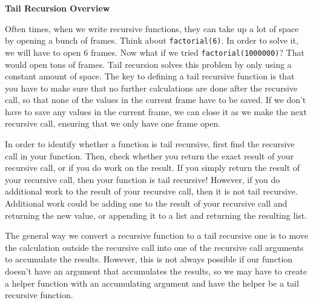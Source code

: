 \textbf{Tail Recursion Overview }


Often times, when we write recursive functions, they can take up a lot of space by opening a bunch of frames.  Think about \texttt{factorial(6)}.  In order to solve it, we will have to open 6 frames.  Now what if we tried \texttt{factorial(1000000)}?  That would open tons of frames.  Tail recursion solves this problem by only using a constant amount of space.  The key to defining a tail recursive function is that you have to make sure that no further calculations are done after the recursive call, so that none of the values in the current frame have to be saved.  If we don’t have to save any values in the current frame, we can close it as we make the next recursive call, ensuring that we only have one frame open.

In order to identify whether a function is tail recursive, first find the recursive call in your function. Then, check whether you return the exact result of your recursive call, or if you do work on the result. If you simply return the result of your recursive call, then your function is tail recursive! However, if you do additional work to the result of your recursive call, then it is not tail recursive. Additional work could be adding one to the result of your recursive call and returning the new value, or appending it to a list and returning the resulting list. 

The general way we convert a recursive function to a tail recursive one is to move the calculation outside the recursive call into one of the recursive call arguments to accumulate the results. However, this is not always possible if our function doesn’t have an argument that accumulates the results, so we may have to create a helper function with an accumulating argument and have the helper be a tail recursive function. 
